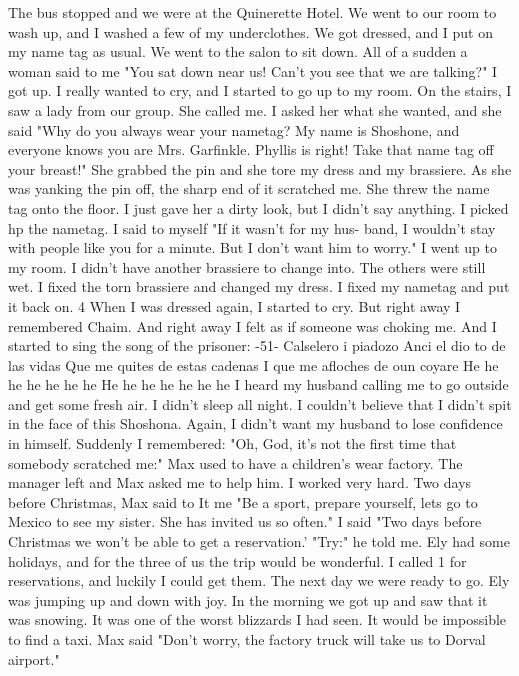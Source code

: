 The bus stopped and we were at the Quinerette Hotel.
We went to our 
room to wash up, and I washed a few of my underclothes.
We got dressed, 
and I put on my name tag as usual.
We went to the salon to sit down.
All of 
a sudden a woman said to me "You sat down near us!
Can't you see that we 
are talking?"
I got up.
I really wanted to cry, and I started to go up to 
my room.
On the stairs, I saw a lady from our group.
She called me.
I 
asked her what she wanted, and she said "Why do you always wear your nametag?
My name is Shoshone, and everyone knows you are Mrs.
Garfinkle.
Phyllis is right!
Take that name tag off your breast!"
She grabbed the pin 
and she tore my dress and my brassiere.
As she was yanking the pin off, 
the sharp end of it scratched me.
She threw the name tag onto the floor.
I 
just gave her a dirty look, but I didn't say anything.
I picked hp the nametag.
I said to myself "If it wasn't for my hus-
band, I wouldn't stay with people like you for a minute.
But I don't want 
him to worry."
I went up to my room.
I didn't have another brassiere to 
change into.
The others were still wet.
I fixed the torn brassiere and 
changed my dress.
I fixed my nametag and put it back on.
4 
When I was dressed again, I started to cry.
But right away I remembered 
Chaim.
And right away I felt as if someone was choking me.
And I started 
to sing the song of the prisoner: 
-51- 
Calselero i piadozo 
Anci el dio to de las vidas 
Que me quites de estas cadenas 
I que me afloches de oun coyare 
He he he he he he he 
He he he he he he he 
I heard my husband calling me to go outside and get some fresh air.
I didn't sleep all night.
I couldn't believe that I didn't spit in the 
face of this Shoshona.
Again, I didn't want my husband to lose confidence 
in himself.
Suddenly I remembered: "Oh, God, it's not the first time that 
somebody scratched me:" 
Max used to have a children's wear factory.
The manager left and Max 
 asked me to help him.
I worked very hard.
Two days before Christmas, Max 
said to It me "Be a sport, prepare yourself, lets go to Mexico to see my 
sister.
She has invited us so often."
I said "Two days before Christmas 
we won't be able to get a reservation.'
"Try:" he told me.
Ely had some 
holidays, and for the three of us the trip would be wonderful.
I called 
1 for reservations, and luckily I could get them.
The next day we were ready to go.
Ely was jumping up and down with joy.
In the morning we got up and saw that it was snowing.
It was one of 
the worst blizzards I had seen.
It would be impossible to find a taxi.
Max said "Don't worry, the factory truck will take us to Dorval airport."
